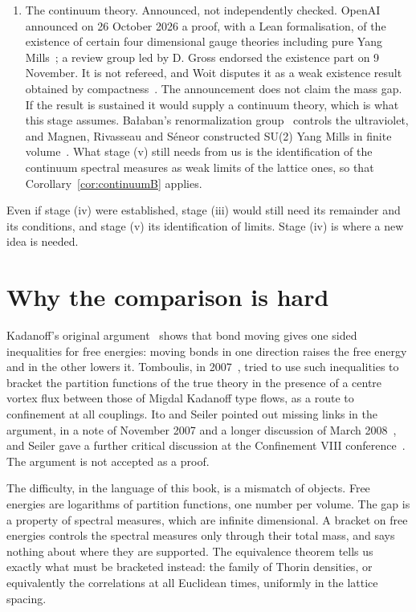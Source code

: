 \begin{enumerate}
\item[(v)] The continuum theory. Announced, not independently checked. OpenAI announced on 26 October 2026 a proof, with a Lean formalisation, of the existence of certain four dimensional gauge theories including pure Yang Mills~\cite{OAI}; a review group led by D. Gross endorsed the existence part on 9 November. It is not refereed, and Woit disputes it as a weak existence result obtained by compactness~\cite{Woit26}. The announcement does not claim the mass gap. If the result is sustained it would supply a continuum theory, which is what this stage assumes. Ba\l aban's renormalization group~\cite{Ba87} controls the ultraviolet, and Magnen, Rivasseau and S\'eneor constructed SU(2) Yang Mills in finite volume~\cite{MRS}. What stage (v) still needs from us is the identification of the continuum spectral measures as weak limits of the lattice ones, so that Corollary~\ref{cor:continuumB} applies.
\end{enumerate}

Even if stage (iv) were established, stage (iii) would still need its remainder and its conditions, and stage (v) its identification of limits. Stage (iv) is where a new idea is needed.

\section{Why the comparison is hard}

Kadanoff's original argument~\cite{Ka75,Ka76} shows that bond moving gives one sided inequalities for free energies: moving bonds in one direction raises the free energy and in the other lowers it. Tomboulis, in 2007~\cite{To07}, tried to use such inequalities to bracket the partition functions of the true theory in the presence of a centre vortex flux between those of Migdal Kadanoff type flows, as a route to confinement at all couplings. Ito and Seiler pointed out missing links in the argument, in a note of November 2007 and a longer discussion of March 2008~\cite{IS}, and Seiler gave a further critical discussion at the Confinement VIII conference~\cite{Se12}. The argument is not accepted as a proof.

The difficulty, in the language of this book, is a mismatch of objects. Free energies are logarithms of partition functions, one number per volume. The gap is a property of spectral measures, which are infinite dimensional. A bracket on free energies controls the spectral measures only through their total mass, and says nothing about where they are supported. The equivalence theorem tells us exactly what must be bracketed instead: the family of Thorin densities, or equivalently the correlations at all Euclidean times, uniformly in the lattice spacing.

